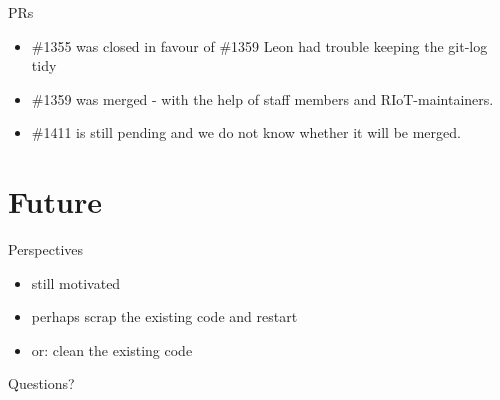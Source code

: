 \documentclass[9pt]{beamer}
\begin{document}
\begin{frame}{PRs}
 \begin{itemize}
 \item \#1355 was closed in favour of \#1359 \textcolor{light-gray}{Leon had trouble keeping the git-log tidy}
 \item \#1359 was merged - with the help of staff members and RIoT-maintainers.
 \item \#1411 is still pending and we do not know whether it will be merged.
 \end{itemize}
\end{frame}

\section{Future}

\begin{frame}{Perspectives}
 \begin{itemize}
 \item still motivated
 \item perhaps scrap the existing code and restart
 \item or: clean the existing code
 \end{itemize}
\end{frame}

\begin{frame}{Questions?}

\end{frame}
\end{document}
